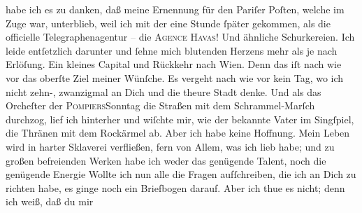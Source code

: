 \begin{ledgroupsized}[t]{13cm}
               habe ich es zu danken, daß \strikeout{\textcolor{gray}{man}} meine Ernennung für den Pariſer Poſten,
               welche im Zuge war, unterblieb, weil ich mit der \label{K_L02669-15v}\label{K_L02669-15h} eine Stunde ſpäter gekommen, als die officielle
               Telegraphenagentur \textcolor{gray}{–} die \textsc{Agence Havas}! Und ähnliche Schurkereien. Ich leide entſetzlich darunter und ſehne mich
               blutenden Herzens mehr als je nach Erlöſung. Ein kleines Capital und Rückkehr nach
                  Wien. Denn das iſt nach wie vor das oberſte
               Ziel meiner Wünſche. Es vergeht nach wie vor kein Tag, {\pb}wo ich nicht zehn-, zwanzigmal an Dich und die
               theure Stadt denke. Und als das
                  Orcheſter der \textsc{Pompiers}Sonntag die Straßen mit dem Schrammel-Marſch durchzog, lief ich
               hinterher und wiſchte mir, wie der bekannte Vater im Singſpiel, die Thränen mit dem Rockärmel
               ab. Aber ich habe keine Hoffnung. Mein Leben wird in harter Sklaverei verfließen,
               fern von Allem, was ich lieb habe; und zu großen befreienden Werken habe ich weder
               das genügende Talent, noch die genügende Energie{\dotsfive}\pend
           \pstart
           Wollte ich nun alle die Fragen aufſchreiben, die ich an Dich zu richten habe, es
               ginge noch ein Briefbogen darauf. Aber ich thue es nicht; denn ich weiß, daß du mir

\end{ledgroupsized}
